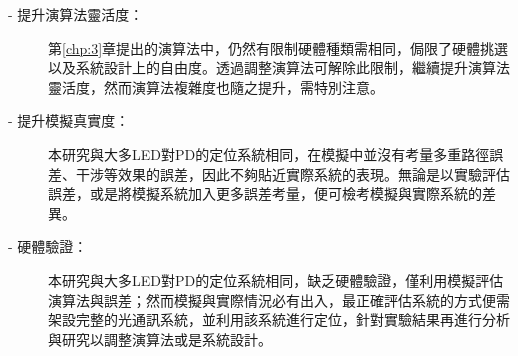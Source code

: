 \begin{description}

    \item[- 提升演算法靈活度：] 第\ref{chp:3}章提出的演算法中，仍然有限制硬體種類需相同，侷限了硬體挑選以及系統設計上的自由度。透過調整演算法可解除此限制，繼續提升演算法靈活度，然而演算法複雜度也隨之提升，需特別注意。
    
    \item[- 提升模擬真實度：] 本研究與大多LED對PD的定位系統相同，在模擬中並沒有考量多重路徑誤差、干涉等效果的誤差，因此不夠貼近實際系統的表現。無論是以實驗評估誤差，或是將模擬系統加入更多誤差考量，便可檢考模擬與實際系統的差異。
    
    \item[- 硬體驗證：]本研究與大多LED對PD的定位系統相同，缺乏硬體驗證，僅利用模擬評估演算法與誤差；然而模擬與實際情況必有出入，最正確評估系統的方式便需架設完整的光通訊系統，並利用該系統進行定位，針對實驗結果再進行分析與研究以調整演算法或是系統設計。
    
    

\end{description}
